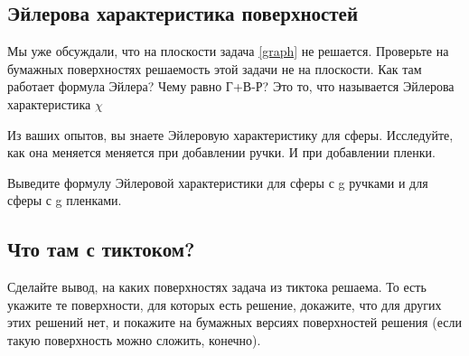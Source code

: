 \documentclass[a4paper,14pt]{extarticle}
\begin{document}
\subsection{Эйлерова характеристика поверхностей}
Мы уже обсуждали, что на плоскости задача \ref{graph} не решается. Проверьте на бумажных поверхностях решаемость этой задачи не на плоскости. Как там работает формула Эйлера? Чему равно Г+В-Р? Это то, что называется Эйлерова характеристика $\chi$

Из ваших опытов, вы знаете Эйлеровую характеристику для сферы. Исследуйте, как она меняется меняется при добавлении ручки. И при добавлении пленки.

Выведите формулу Эйлеровой характеристики для сферы с g ручками и для сферы с g пленками.

\subsection{Что там с тиктоком?}
Сделайте вывод, на каких поверхностях задача из тиктока решаема. То есть укажите те поверхности, для которых есть решение, докажите, что для других этих решений нет, и покажите на бумажных версиях поверхностей решения (если такую поверхность можно сложить, конечно).
\end{document}
